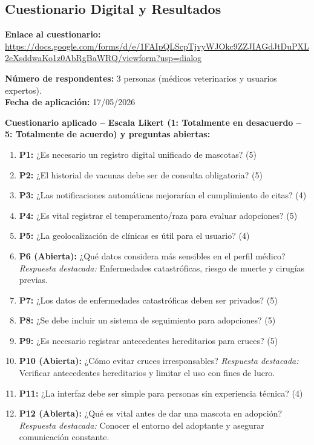 \documentclass[journal,onecolumn]{IEEEtran}
\begin{document}
\subsection{Cuestionario Digital y Resultados}

\textbf{Enlace al cuestionario:} \\ \url{https://docs.google.com/forms/d/e/1FAIpQLScpTjvyWJOkc9ZZJIAGdJtDuPXL2eXsddwaKo1z0AbRgBaWRQ/viewform?usp=dialog}

\textbf{Número de respondentes:} 3 personas (médicos veterinarios y usuarios expertos).\\
\textbf{Fecha de aplicación:} 17/05/2026

\textbf{Cuestionario aplicado -- Escala Likert (1: Totalmente en desacuerdo -- 5: Totalmente de acuerdo) y preguntas abiertas:}

\begin{enumerate}[leftmargin=*]
	\item \textbf{P1:} ¿Es necesario un registro digital unificado de mascotas? (5)
	\item \textbf{P2:} ¿El historial de vacunas debe ser de consulta obligatoria? (5)
	\item \textbf{P3:} ¿Las notificaciones automáticas mejorarían el cumplimiento de citas? (4)
	\item \textbf{P4:} ¿Es vital registrar el temperamento/raza para evaluar adopciones? (5)
	\item \textbf{P5:} ¿La geolocalización de clínicas es útil para el usuario? (4)
	\item \textbf{P6 (Abierta):} ¿Qué datos considera más sensibles en el perfil médico? \textit{Respuesta destacada:} Enfermedades catastróficas, riesgo de muerte y cirugías previas.
	\item \textbf{P7:} ¿Los datos de enfermedades catastróficas deben ser privados? (5)
	\item \textbf{P8:} ¿Se debe incluir un sistema de seguimiento para adopciones? (5)
	\item \textbf{P9:} ¿Es necesario registrar antecedentes hereditarios para cruces? (5)
	\item \textbf{P10 (Abierta):} ¿Cómo evitar cruces irresponsables? \textit{Respuesta destacada:} Verificar antecedentes hereditarios y limitar el uso con fines de lucro.
	\item \textbf{P11:} ¿La interfaz debe ser simple para personas sin experiencia técnica? (4)
	\item \textbf{P12 (Abierta):} ¿Qué es vital antes de dar una mascota en adopción? \textit{Respuesta destacada:} Conocer el entorno del adoptante y asegurar comunicación constante.
\end{enumerate}
\end{document}
